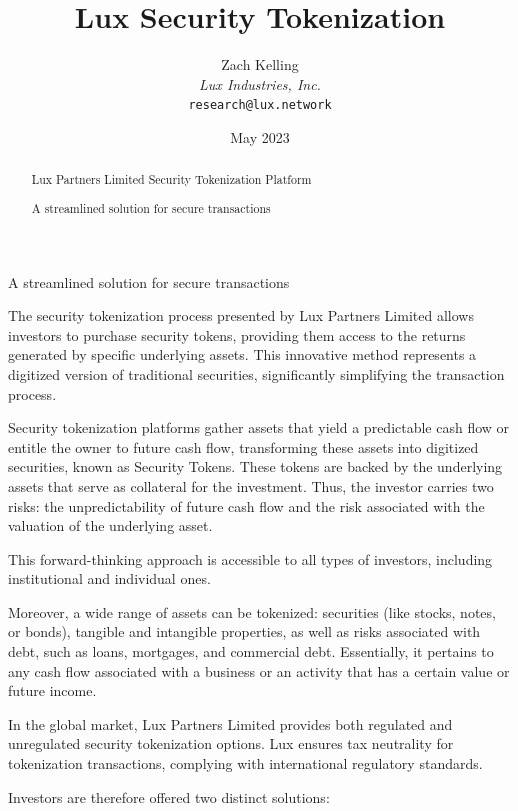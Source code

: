 \documentclass[11pt]{article}
\title{Lux Security Tokenization}
\author{Zach Kelling\\\textit{Lux Industries, Inc.}\\\texttt{research@lux.network}}
\date{May 2023}
\begin{document}
\luxcoverpage

\begin{abstract}
Lux Partners Limited Security Tokenization Platform

A streamlined solution for secure transactions
\end{abstract}

\tableofcontents
\newpage


A streamlined solution for secure transactions


The security tokenization process presented by Lux Partners Limited allows investors to purchase security tokens, providing them access to the returns generated by specific underlying assets. This innovative method represents a digitized version of traditional securities, significantly simplifying the transaction process.


Security tokenization platforms gather assets that yield a predictable cash flow or entitle the owner to future cash flow, transforming these assets into digitized securities, known as Security Tokens. These tokens are backed by the underlying assets that serve as collateral for the investment. Thus, the investor carries two risks: the unpredictability of future cash flow and the risk associated with the valuation of the underlying asset.


This forward-thinking approach is accessible to all types of investors, including institutional and individual ones.


Moreover, a wide range of assets can be tokenized: securities (like stocks, notes, or bonds), tangible and intangible properties, as well as risks associated with debt, such as loans, mortgages, and commercial debt. Essentially, it pertains to any cash flow associated with a business or an activity that has a certain value or future income.


In the global market, Lux Partners Limited provides both regulated and unregulated security tokenization options. Lux ensures tax neutrality for tokenization transactions, complying with international regulatory standards.


Investors are therefore offered two distinct solutions:
\end{document}
